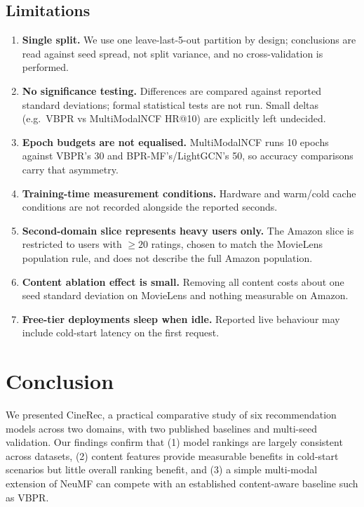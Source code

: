 \documentclass[11pt,a4paper]{article}
\begin{document}
\subsection{Limitations}
\begin{enumerate}[leftmargin=2em,itemsep=2pt,topsep=3pt]
  \item \textbf{Single split.} We use one leave-last-5-out partition by design;
        conclusions are read against seed spread, not split variance, and no
        cross-validation is performed.
  \item \textbf{No significance testing.} Differences are compared against
        reported standard deviations; formal statistical tests are not run.
        Small deltas (e.g.\ VBPR vs MultiModalNCF HR@10) are explicitly left
        undecided.
  \item \textbf{Epoch budgets are not equalised.} MultiModalNCF runs 10 epochs
        against VBPR's 30 and BPR-MF's/LightGCN's 50, so accuracy comparisons
        carry that asymmetry.
  \item \textbf{Training-time measurement conditions.} Hardware and warm/cold
        cache conditions are not recorded alongside the reported seconds.
  \item \textbf{Second-domain slice represents heavy users only.} The Amazon
        slice is restricted to users with $\geq20$ ratings, chosen to match the
        MovieLens population rule, and does not describe the full Amazon
        population.
  \item \textbf{Content ablation effect is small.} Removing all content costs
        about one seed standard deviation on MovieLens and nothing measurable on
        Amazon.
  \item \textbf{Free-tier deployments sleep when idle.} Reported live behaviour
        may include cold-start latency on the first request.
\end{enumerate}

\section{Conclusion}
We presented CineRec, a practical comparative study of six recommendation models
across two domains, with two published baselines and multi-seed validation. Our
findings confirm that (1) model rankings are largely consistent across datasets,
(2) content features provide measurable benefits in cold-start scenarios but
little overall ranking benefit, and (3) a simple multi-modal extension of NeuMF
can compete with an established content-aware baseline such as VBPR.
\end{document}
